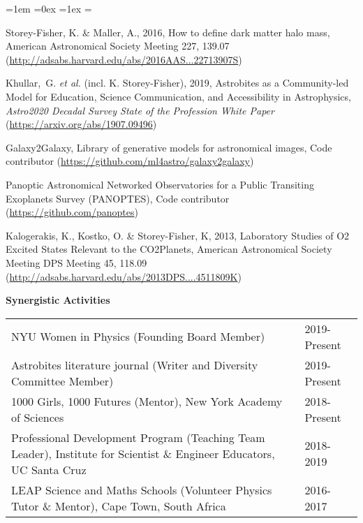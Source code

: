 \documentclass[12pt]{article}
\newcommand{\head}[1]{\vspace{1cm}\textbf{#1}\vspace{0.2cm}\\}
\newcommand{\ksflist}{%
  \rightmargin=0in
  \leftmargin=1em
  \topsep=0ex
  \partopsep=0pt
  \itemsep=1ex
  \parsep=0pt
  \itemindent=-1.0\leftmargin
  \listparindent=\leftmargin
  \settowidth{\labelsep}{~}
  \usecounter{enumi}
}
\begin{document}
\begin{list}{}{\ksflist}
\item
Storey-Fisher, K. \& Maller, A., 2016, How to define dark matter halo mass, American Astronomical Society Meeting 227, 139.07 (\href{http://adsabs.harvard.edu/abs/2016AAS...22713907S}{http://adsabs.harvard.edu/abs/2016AAS...22713907S})
\item
Khullar,~G. \textit{et al.} (incl. K. Storey-Fisher), 2019, Astrobites as a Community-led Model for Education, Science Communication, and Accessibility in Astrophysics, \textit{Astro2020 Decadal Survey State of the Profession White Paper} (\href{https://arxiv.org/abs/1907.09496}{https://arxiv.org/abs/1907.09496})\\
\item
Galaxy2Galaxy, Library of generative models for astronomical images, Code contributor (\href{https://github.com/ml4astro/galaxy2galaxy}{https://github.com/ml4astro/galaxy2galaxy}) \\
\item
Panoptic Astronomical Networked Observatories for a Public Transiting Exoplanets Survey (PANOPTES), Code contributor (\href{https://github.com/panoptes}{https://github.com/panoptes}) \\
\item
Kalogerakis, K., Kostko, O. \& Storey-Fisher, K, 2013, Laboratory Studies of O2 Excited States Relevant to the CO2Planets, American Astronomical Society Meeting DPS Meeting 45, 118.09 (\href{http://adsabs.harvard.edu/abs/2013DPS....4511809K}{http://adsabs.harvard.edu/abs/2013DPS....4511809K})  \\ 

\end{list}

\newpage
\head{Synergistic Activities}

{\renewcommand{\arraystretch}{1.5}
\hspace{-0.3cm}\begin{tabularx}{\textwidth}{ht} 

NYU Women in Physics (Founding Board Member) & 2019-Present \\

Astrobites literature journal (Writer and Diversity Committee Member) & 2019-Present \\

1000 Girls, 1000 Futures (Mentor), New York Academy of Sciences & 2018-Present \\

Professional Development Program (Teaching Team Leader), Institute for Scientist \& Engineer Educators, UC Santa Cruz & 2018-2019 \\  

LEAP Science and Maths Schools (Volunteer Physics Tutor \& Mentor), Cape Town, South Africa & 2016-2017 \\

\end{tabularx}
}
\end{document}
